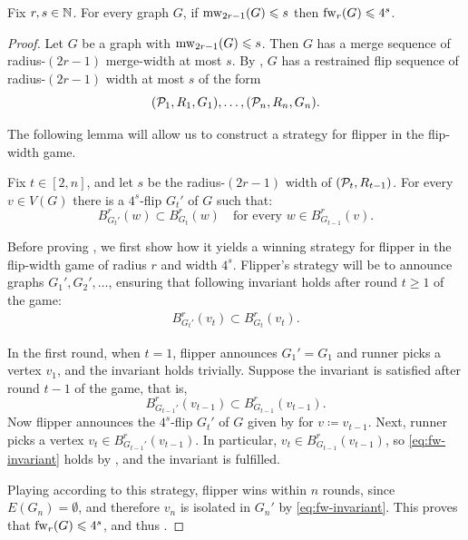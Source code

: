\begin{lemma}\label{lem:fw}
    Fix $r,s\in\N$. 
    For every graph $G$, if $\mw_{2r-1}(G)\le s$ then  $\fw_r(G)\le 4^s$. 
\end{lemma}

\begin{proof}
    Let $G$ be a graph with $\mw_{2r-1}(G)\le s$. Then $G$ has a merge sequence of radius-$(2r-1)$ merge-width at most $s$.
    By , $G$ has a 
 restrained flip sequence of radius-$(2r-1)$ width at most \(s\) of the form
$$(\cal P_1,R_1,G_1),\ldots,(\cal P_n,R_n,G_n).$$

The following lemma will allow us to construct a strategy for flipper in the flip-width game.

\begin{lemma}\label{lem:strategy}
    Fix $t\in [2,n]$, and 
    let $s$ be the radius-$(2r-1)$ width of $(\cal P_t,R_{t-1})$.
    For every $v\in V(G)$ there is a $4^s$-flip $G_t'$ of $G$ such that:
$$B^r_{G_t'}(w)\subset B^r_{G_t}(w)\quad\text{for every $w\in B^r_{G_{t-1}}(v)$.}$$
\end{lemma}
Before proving , we first show how it yields a winning strategy
for flipper in the flip-width game of radius $r$
    and width $4^s$.
Flipper's strategy will be to announce graphs $G_1',G_2',\ldots$, ensuring  that following invariant holds after round $t\ge 1$ of the game:
    \begin{align}\label{eq:fw-invariant}
    B^r_{G_{t}'}(v_t)\subset B^r_{G_t}(v_t).    
    \end{align}
    
    In the first round, when $t=1$, flipper announces $G_1'=G_1$ and runner picks a vertex 
    $v_1$,
    and the invariant holds trivially.
    Suppose the invariant is satisfied after round $t-1$ of the game,
    that is, 
    $$B^r_{G_{t-1}'}(v_{t-1})\subset B^r_{G_{t-1}}(v_{t-1}).$$
    Now flipper announces the $4^s$-flip $G_t'$ of $G$
    given by  for $v \coloneqq v_{t-1}$.
    Next, runner picks a vertex $v_t\in B^r_{G_{t-1}'}(v_{t-1})$.
In particular, $v_t\in B^r_{G_{t-1}}(v_{t-1})$, so 
 \eqref{eq:fw-invariant} holds by , and the invariant is fulfilled.

    Playing according to this strategy, flipper wins within $n$ rounds,
    since $E(G_n)=\emptyset$, and therefore $v_n$ is isolated in $G_n'$
    by \eqref{eq:fw-invariant}. This proves that $\fw_r(G)\le 4^s$, and thus .
\end{proof}

